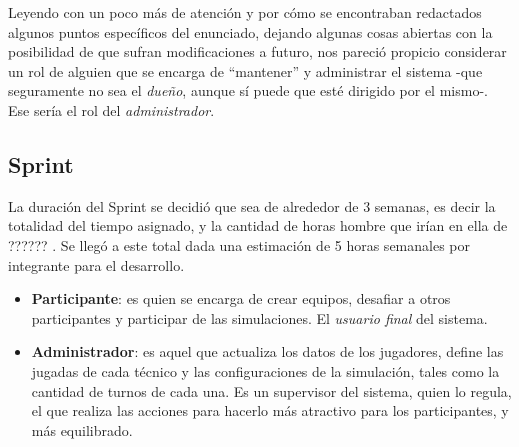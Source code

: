 Leyendo con un poco más de atención y por cómo se encontraban redactados algunos puntos específicos del enunciado, dejando algunas cosas abiertas con la posibilidad de que sufran modificaciones a futuro, nos pareció propicio considerar un rol de alguien que se encarga de ``mantener'' y administrar el sistema -que seguramente no sea el \emph{dueño}, aunque sí puede que esté dirigido por el mismo-. Ese sería el rol del \emph{administrador}.

\subsection{Sprint}
La duración del Sprint se decidió que sea de alrededor de 3 semanas, es decir la totalidad del tiempo asignado, y la cantidad de horas hombre que irían en ella de ?????? . Se llegó a este total dada una estimación de 5 horas semanales por integrante para el desarrollo.

\begin{itemize}
\item \textbf{Participante}: es quien se encarga de crear equipos, desafiar a otros participantes y participar de las simulaciones. El \textit{usuario final} del sistema.
\item \textbf{Administrador}: es aquel que actualiza los datos de los jugadores, define las jugadas de cada técnico y las configuraciones de la simulación, tales como la cantidad de turnos de cada una. Es un supervisor del sistema, quien lo regula, el que realiza las acciones para hacerlo más atractivo para los participantes, y más equilibrado.
\end{itemize}
